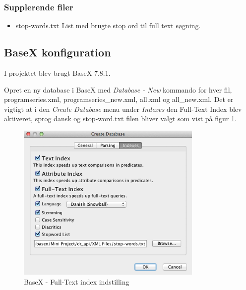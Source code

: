 \subsubsection{Supplerende filer}

\begin{itemize}
\item{stop-words.txt} List med brugte stop ord til full text søgning.
\end{itemize}



\subsection{BaseX konfiguration}
I projektet blev brugt BaseX 7.8.1.

Opret en ny database i BaseX med \textit{Database - New} kommando for hver fil, programseries.xml, programseries\_new.xml, all.xml og all\_new.xml. Det er vigtigt at i den \textit{Create Database} menu under \textit{Indexes} den Full-Text Index blev aktiveret, sprog dansk og stop-word.txt filen bliver valgt som vist på figur \ref{inst:BaseXIndex}.

\begin{figure}[h!]
  \centering
   \includegraphics[width=0.8\textwidth]{pic/BaseX-Index.png}
   \caption{BaseX - Full-Text index indstilling }
	\label{inst:BaseXIndex}
\end{figure}

